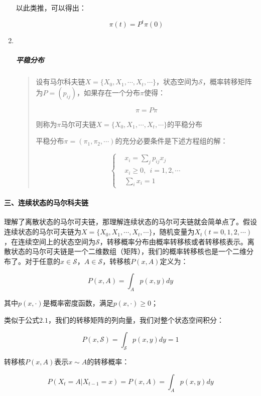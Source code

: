 \begin{enumerate}
  以此类推，可以得出：

  \[\pi(t) = P^{t}\pi(0)\]
\item ~
  \hypertarget{ux5e73ux7a33ux5206ux5e03}{%
  \subparagraph{平稳分布}\label{ux5e73ux7a33ux5206ux5e03}}

  \begin{quote}
  设有马尔科夫链\(X = \{X_0,X_1,\cdots,X_t,\cdots\}\)，状态空间为\(\mathcal{S}\)，概率转移矩阵为\(P=(p_{ij})\)，如果存在一个分布\(\pi\)使得：

  \[\pi = P\pi\]

  则称为\(\pi\)马尔可夫链\(X = \{X_0,X_1,\cdots,X_t,\cdots\}\)的平稳分布

  平稳分布\(\pi = (\pi_1,\pi_2,\cdots)\)的充分必要条件是下述方程组的解：

  \[\left\{
  \begin{aligned}
  &x_i = \sum_{j}p_{ij}x_j \\
  &x_i\ge0,\ \ i=1,2,\cdots \\
  &\sum_{i}x_i=1
  \end{aligned}
  \right.\]
  \end{quote}
\end{enumerate}

\hypertarget{ux4e09ux8fdeux7eedux72b6ux6001ux7684ux9a6cux5c14ux79d1ux592bux94fe}{%
\paragraph{三、连续状态的马尔科夫链}\label{ux4e09ux8fdeux7eedux72b6ux6001ux7684ux9a6cux5c14ux79d1ux592bux94fe}}

理解了离散状态的马尔可夫链，那理解连续状态的马尔可夫链就会简单点了。假设连续状态的马尔可夫链为\(X=\{X_0,X_1,\cdots,X_t,\cdots\}\)，随机变量为\(X_t(t=0,1,2,\cdots)\)，在连续空间上的状态空间为\(\mathcal{S}\)，转移概率分布由概率转移核或者转移核表示。离散状态的马尔可夫链是一个二维数组（矩阵），我们的概率转移核也是一个二维分布了。对于任意的\(x\in \mathcal{S}\)，\(A\in \mathcal{S}\)，转移核\(P(x,A)\)定义为：

\[P(x,A)=\int_A p(x,y)dy\]

其中\(p(x,\cdot)\)是概率密度函数，满足\(p(x,\cdot)\geq0\)；

类似于公式\(2.1\)，我们的转移矩阵的列向量，我们对整个状态空间积分：

\[P(x,\mathcal{S})=\int_{\mathcal{S}}p(x,y)dy=1\]

转移核\(P(x,A)\)表示\(x\sim A\)的转移概率：

\[P(X_t=A|X_{t-1}=x)=P(x,A)=\int_A p(x,y)dy\]

